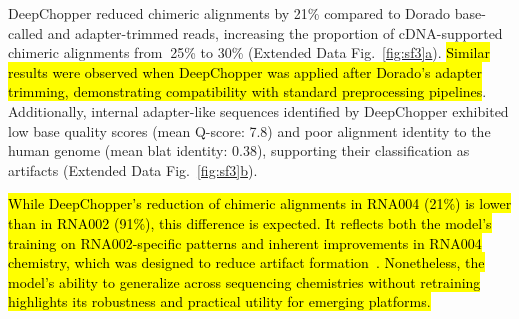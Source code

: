 \documentclass[pdflatex,sn-nature, lineno]{sn-jnl}%
\newcommand{\edfigref}[2]{Extended Data Fig.~\hyperref[#1]{\ref*{#1}#2}}
\begin{document}
DeepChopper reduced chimeric alignments by 21\% compared to Dorado base-called and adapter-trimmed reads, increasing the proportion of cDNA-supported chimeric alignments from $~$25\% to 30\% (\edfigref{fig:sf3}{a}). 
\hl{Similar results were observed when DeepChopper was applied after Dorado's adapter trimming, demonstrating compatibility with standard preprocessing pipelines}.
Additionally, internal adapter-like sequences identified by DeepChopper exhibited low base quality scores (mean Q-score: 7.8) and poor alignment identity to the human genome (mean \gls{blat} identity: 0.38), supporting their classification as artifacts (\edfigref{fig:sf3}{b}).

\hl{While DeepChopper’s reduction of chimeric alignments in RNA004 (21\%) is lower than in RNA002 (91\%), this difference is expected.
It reflects both the model’s training on RNA002-specific patterns and inherent improvements in RNA004 chemistry, which was designed to reduce artifact formation\mbox{~\cite{hewel2024direct}}. Nonetheless, the model’s ability to generalize across sequencing chemistries without retraining highlights its robustness and practical utility for emerging platforms.}
\end{document}
